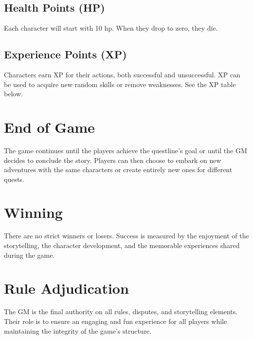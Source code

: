 \documentclass{article}
\begin{document}
\subsection*{Health Points (HP)}

Each character will start with 10 hp. When they drop to zero, they die.

\subsection*{Experience Points (XP)}

Characters earn XP for their actions, both successful and unsuccessful. XP can be used to acquire new random skills or remove weaknesses. See the XP table below.

\section*{End of Game}

The game continues until the players achieve the questline's goal or until the GM decides to conclude the story. Players can then choose to embark on new adventures with the same characters or create entirely new ones for different quests.

\section*{Winning}

There are no strict winners or losers. Success is measured by the enjoyment of the storytelling, the character development, and the memorable experiences shared during the game.

\section*{Rule Adjudication}

The GM is the final authority on all rules, disputes, and storytelling elements. Their role is to ensure an engaging and fun experience for all players while maintaining the integrity of the game's structure.

\newpage
\end{document}
